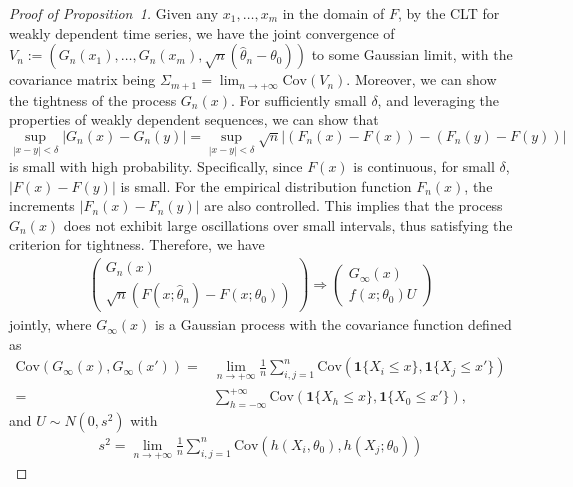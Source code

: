 \documentclass[12pt]{article}
\begin{document}
\begin{proof}[Proof of Proposition~1]
Given any $x_1,\dots,x_m$ in the domain of $F$, by the CLT for weakly dependent time series, we have the joint convergence of 
$V_n:=(G_n(x_1),\dots,G_n(x_m),\sqrt{n}(\hat{\theta}_n-\theta_0))$
to some Gaussian limit, with the covariance matrix being $\Sigma_{m+1}=\lim_{n\rightarrow+\infty}\text{Cov}(V_n)$.
Moreover, we can show the tightness of the process $G_n(x)$. 
For sufficiently small $\delta$, and leveraging the properties of weakly 
dependent sequences, we can show that
\[ \sup_{|x - y| < \delta} |G_n(x) - G_n(y)| = \sup_{|x - y| < \delta} 
\sqrt{n}|(F_n(x) - F(x)) - (F_n(y) - F(y))| \]
is small with high probability.
Specifically, since $F(x)$ is continuous, for small 
$\delta$, $|F(x) - F(y)|$ is small. For the empirical 
distribution function $F_n(x)$, the increments $|F_n(x) - F_n(y)|$ are 
also controlled. 
This implies that the process $G_n(x)$ does not exhibit large oscillations over 
small intervals, thus satisfying the criterion for tightness.
Therefore, we have
\begin{align*}
\begin{pmatrix}
G_n(x)  \\ 
\sqrt{n}(F(x;\hat{\theta}_n)-F(x;\theta_0))
\end{pmatrix}\Rightarrow
\begin{pmatrix}
G_{\infty}(x) \\
f(x;\theta_0)U
\end{pmatrix}
\end{align*}
jointly, where $G_{\infty}(x)$ is a Gaussian process with the covariance function defined as
\begin{align*}
\text{Cov}(G_{\infty}(x),G_{\infty}(x'))=& \lim_{n\rightarrow+\infty}\frac{1}{n}\sum^{n}_{i,j=1}\text{Cov}(\mathbf{1}\{X_i\leq x\},\mathbf{1}\{X_j\leq x'\})
\\=& \sum^{+\infty}_{h=-\infty}\text{Cov}(\mathbf{1}\{X_{h}\leq x\},\mathbf{1}\{X_0\leq x'\}),
\end{align*}
and $U\sim N(0,s^2)$ with 
\begin{align*}
s^2=\lim_{n\rightarrow+\infty}\frac{1}{n}\sum^{n}_{i,j=1}\text{Cov}(h(X_i,\theta_0),h(X_j;\theta_0))

\end{align*}
\end{proof}
\end{document}
